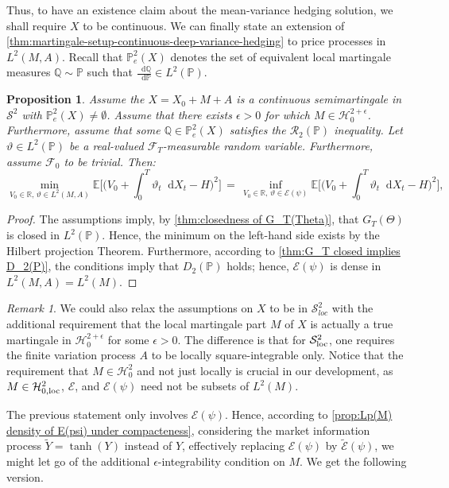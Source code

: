 \documentclass[11pt,a4paper,twoside,openany]{report}
\newcommand{\diff}{\mathop{}\!\mathrm{d}}
\theoremstyle{plain} %
\newtheorem{proposition}[proposition]{Proposition}
\theoremstyle{definition} %
\theoremstyle{remark} %
\newtheorem{remark}[remark]{Remark}
\begin{document}
Thus, to have an existence claim about the mean-variance hedging solution, we shall require \(X\) to be continuous. We can finally state an extension of 
\cref{thm:martingale-setup-continuous-deep-variance-hedging} to price processes in \(L^2(M,A)\). Recall that  \(\mathbb{\mathbb{P}}_e^2(X)\) denotes the set of equivalent local martingale measures \(\mathbb{Q}\sim \mathbb{P}\) such that \(\frac{\diff \mathbb{Q}}{\diff \mathbb{P}}\in L^2(\mathbb{P})\).


\begin{proposition}\label{prop:continuous time deep mean variance hedging for semimartingales under compactness}
    Assume the \(X=X_0+M+A\) is a continuous semimartingale in \(\mathcal{S}^2\) with \(\mathbb{P}_e^2(X)\neq\emptyset\). Assume that there exists \(\epsilon>0\) for which \(M\in\mathcal{H}_0^{2+\epsilon}\). Furthermore, assume that some \(\mathbb{Q}\in\mathbb{P}^2_e(X)\) satisfies the \(\mathcal{R}_2(\mathbb{P})\) inequality. Let \(\vartheta\in L^2(\mathbb{P})\) be a real-valued \(\mathcal{F}_{T}\)-measurable random variable. Furthermore, assume \(\mathcal{F}_0\) to be trivial. Then:
\begin{equation}\label{eq:martingale setup, continuous deep variance hedging}
    \min_{V_0\in\mathbb{R},\,\vartheta\in L^2(M,A)}\mathbb{E}\bigg[\bigg(V_0+\int_{0}^T\vartheta_t\diff X_t-H\bigg)^2\bigg]
    \,=\,\inf_{V_0\in\mathbb{R},\,\vartheta\in \mathcal{E}(\psi)}
    \mathbb{E}\bigg[\bigg(V_0+\int_{0}^T\vartheta_t\diff X_t-H\bigg)^2\bigg],
\end{equation}
\end{proposition}
\begin{proof}
   The assumptions imply, by \cref{thm:closedness of G_T(Theta)}, that \(G_T(\Theta)\) is closed in  \(L^2(\mathbb{P})\). Hence, the minimum on the left-hand side exists by the Hilbert projection Theorem. Furthermore, according to \cref{thm:G_T closed implies D_2(P)}, the conditions imply that \(D_2(\mathbb{P})\) holds; hence, \(\mathcal{E}(\psi)\) is dense in \(L^2(M,A)=L^2(M)\).
\end{proof}
\begin{remark}\label{rem:relaxed assumptions}
    We could also relax the assumptions on \(X\) to be in \(\mathcal{S}^2_{loc}\) with the additional requirement that the local martingale part \(M\) of \(X\) is actually a true martingale in \(\mathcal{H}_0^{2+\epsilon}\) for some \(\epsilon>0\). The difference is that for \(\mathcal{S}_{\rm{loc}}^2\), one requires the finite variation process \(A\) to be locally square-integrable only. Notice that the requirement that \(M\in\mathcal{H}^2_0\) and not just locally is crucial in our development, as \(M\in\mathcal{H}^2_{0,\rm{loc}}\), \(\mathcal{E}\), and \(\mathcal{E}(\psi)\) need not be subsets of \(L^2(M)\).
\end{remark}
The previous statement only involves \(\mathcal{E}(\psi)\). Hence, 
according to \cref{prop:Lp(M) density of E(psi) under compacteness}, considering the market information process \(\widetilde{Y}=\tanh(Y)\) instead of \(Y\), effectively replacing \(\mathcal{E}(\psi)\) by \(\widetilde{\mathcal{E}}(\psi)\), we might let go of the additional \(\epsilon\)-integrability condition on \(M\). We get the following version. 
\end{document}
